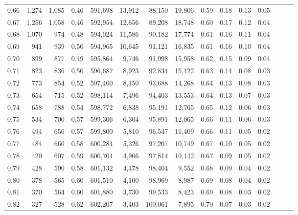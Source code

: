 \begin{tabular}{rrrrrrrrrrrrrrr}
0.66 &   1,274 &  1,085 &  0.46 &  591,698 &   13,912 &   88,150 &   19,806 &  0.59 &  0.18 &  0.13 &      0.05 \\
0.67 &   1,256 &  1,058 &  0.46 &  592,954 &   12,656 &   89,208 &   18,748 &  0.60 &  0.17 &  0.12 &      0.04 \\
0.68 &   1,070 &    974 &  0.48 &  594,024 &   11,586 &   90,182 &   17,774 &  0.61 &  0.16 &  0.11 &      0.04 \\
0.69 &     941 &    939 &  0.50 &  594,965 &   10,645 &   91,121 &   16,835 &  0.61 &  0.16 &  0.10 &      0.04 \\
0.70 &     899 &    877 &  0.49 &  595,864 &    9,746 &   91,998 &   15,958 &  0.62 &  0.15 &  0.09 &      0.04 \\
0.71 &     823 &    836 &  0.50 &  596,687 &    8,923 &   92,834 &   15,122 &  0.63 &  0.14 &  0.08 &      0.03 \\
0.72 &     773 &    854 &  0.52 &  597,460 &    8,150 &   93,688 &   14,268 &  0.64 &  0.13 &  0.08 &      0.03 \\
0.73 &     654 &    715 &  0.52 &  598,114 &    7,496 &   94,403 &   13,553 &  0.64 &  0.13 &  0.07 &      0.03 \\
0.74 &     658 &    788 &  0.54 &  598,772 &    6,838 &   95,191 &   12,765 &  0.65 &  0.12 &  0.06 &      0.03 \\
0.75 &     534 &    700 &  0.57 &  599,306 &    6,304 &   95,891 &   12,065 &  0.66 &  0.11 &  0.06 &      0.03 \\
0.76 &     494 &    656 &  0.57 &  599,800 &    5,810 &   96,547 &   11,409 &  0.66 &  0.11 &  0.05 &      0.02 \\
0.77 &     484 &    660 &  0.58 &  600,284 &    5,326 &   97,207 &   10,749 &  0.67 &  0.10 &  0.05 &      0.02 \\
0.78 &     420 &    607 &  0.59 &  600,704 &    4,906 &   97,814 &   10,142 &  0.67 &  0.09 &  0.05 &      0.02 \\
0.79 &     428 &    590 &  0.58 &  601,132 &    4,478 &   98,404 &    9,552 &  0.68 &  0.09 &  0.04 &      0.02 \\
0.80 &     378 &    565 &  0.60 &  601,510 &    4,100 &   98,969 &    8,987 &  0.69 &  0.08 &  0.04 &      0.02 \\
0.81 &     370 &    564 &  0.60 &  601,880 &    3,730 &   99,533 &    8,423 &  0.69 &  0.08 &  0.03 &      0.02 \\
0.82 &     327 &    528 &  0.62 &  602,207 &    3,403 &  100,061 &    7,895 &  0.70 &  0.07 &  0.03 &      0.02 \\

\end{tabular}
